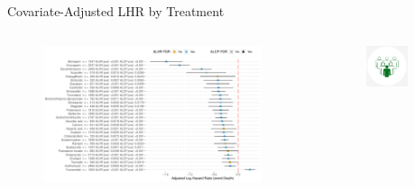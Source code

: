 \documentclass[compress,ignorenonframetext,aspectratio=1610,handout]{beamer}
\begin{document}
\begin{frame}{Covariate-Adjusted LHR by Treatment}
	\begin{columns}
		\begin{figure}
			\includegraphics[width=0.94\textwidth]{figs/results/bps_covid_repurposing_summary.pdf}
		\end{figure}

		\begin{figure}
			\includegraphics[width=0.7\textwidth]{figs/logos/bps.png}	
		\end{figure}


\end{columns}
\end{frame}
\end{document}
